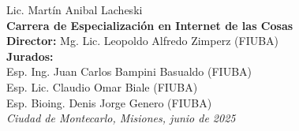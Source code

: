 \begin{titlepage}
\begin{flushright}
        {\fontsize{20pt}{25pt}\selectfont
        Lic. Martín Anibal Lacheski} \\[1cm]

        {\fontsize{15pt}{20pt}\selectfont
        \textbf{Carrera de Especialización en Internet de las Cosas}
        } \\[2cm]

        {\fontsize{11pt}{15pt}\selectfont
        \textbf{Director:} Mg. Lic. Leopoldo Alfredo Zimperz (FIUBA)} \\[1cm]

        {\fontsize{11pt}{15pt}\selectfont
        \textbf{Jurados:}} \\[0.5cm]
        {\fontsize{11pt}{15pt}\selectfont
        Esp. Ing. Juan Carlos Bampini Basualdo (FIUBA)} \\ 
        {\fontsize{11pt}{15pt}\selectfont
        Esp. Lic. Claudio Omar Biale (FIUBA)} \\ 
        {\fontsize{11pt}{15pt}\selectfont
        Esp. Bioing. Denis Jorge Genero (FIUBA)} \\[2cm]

        {\itshape\fontsize{10pt}{12pt}\selectfont
        Ciudad de Montecarlo, Misiones, junio de 2025} %
    \end{flushright}
\end{titlepage}
